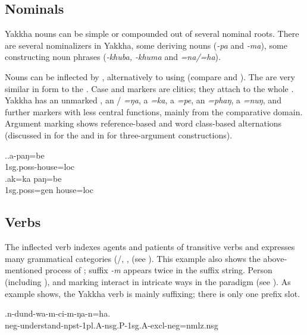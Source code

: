 \subsection{Nominals}

Yakkha nouns can be simple or compounded out of several nominal roots. There are several nominalizers in Yakkha, some deriving nouns (\emph{-pa} and \emph{-ma}), some constructing noun phrases (\emph{-khuba, -khuma} and \emph{=na/=ha}).

 Nouns can be inflected by , alternatively to using  (compare \Next[a] and \Next[b]). The  are very similar in form to the . Case and  markers are clitics; they attach to the whole . Yakkha has an unmarked , an / \emph{=ŋa}, a  \emph{=ka}, a  \emph{=pe}, an  \emph{=phaŋ}, a  \emph{=nuŋ}, and further markers with less central functions, mainly from the comparative domain. Argument marking shows reference-based and word class-based alternations (discussed in  for the   and in  for three-argument constructions).

\ex.\ag.a-paŋ=be\\ 
{\sc 1sg.poss-}house{\sc =loc}\\
\bg.ak=ka paŋ=be\\
{\sc 1sg.poss=gen} house{\sc =loc}\\


\subsection{Verbs}

The inflected verb  indexes agents and patients of transitive verbs and expresses many grammatical categories (/, ,  (see \Next). This example also shows the above-mentioned process of ; suffix \emph{-m} appears twice in the suffix string. Person (including ),  and  marking interact in intricate ways in the  paradigm (see ). As example \Next shows, the Yakkha verb is mainly suffixing; there is only one prefix slot. 

\exg.n-dund-wa-m-ci-m-ŋa-n=ha.\\
{\sc neg-}understand{\sc -npst-1pl.A-nsg.P-1sg.A-excl-neg=nmlz.nsg}\\


